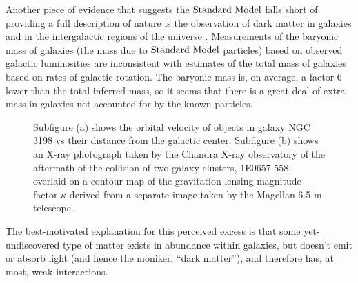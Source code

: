 Another piece of evidence that suggests the $\text{Standard\ Model}$ falls short of providing a full description of nature is the observation of dark matter in galaxies and in the intergalactic regions of the universe \cite{Davis:1985rj}\cite{Komatsu:2008hk}. Measurements of the baryonic mass of galaxies (the mass due to $\text{Standard\ Model}$ particles) based on observed galactic luminosities are inconsistent with estimates of the total mass of galaxies based on rates of galactic rotation. The baryonic mass is, on average, a factor 6 lower than the total inferred mass, so it seems that there is a great deal of extra mass in galaxies not accounted for by the known particles.  
\begin{figure}[h]
\caption{Subfigure (a) \cite{vanAlbada:1984js} shows the orbital velocity of objects in galaxy NGC 3198 vs their distance from the galactic center. Subfigure (b) \cite{Clowe:2006xq} shows an X-ray photograph taken by the Chandra X-ray observatory of the aftermath of the collision of two galaxy clusters, 1E0657-558, overlaid on a contour map of the gravitation lensing magnitude factor $\kappa$ derived from a separate image taken by the Magellan 6.5 m telescope. } 
\label{fig:DM}
\end{figure}
The best-motivated explanation for this perceived excess is that some yet-undiscovered type of matter exists in abundance within galaxies, but doesn't emit or absorb light (and hence the moniker, ``dark matter''), and therefore has, at most, weak interactions. 

